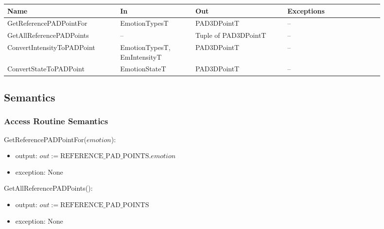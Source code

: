 \begin{center}
    \renewcommand{\arraystretch}{1.2}
    \begin{tabular}{m{0.27\linewidth} m{0.18\linewidth} m{0.22\linewidth}
    m{0.23\linewidth}}
        \toprule
        \textbf{Name} & \textbf{In} & \textbf{Out} & \textbf{Exceptions} \\
        \midrule

        \rowcolor[gray]{0.9}GetReferencePADPointFor & EmotionTypesT &
        PAD3DPointT & -- \\

        GetAllReferencePADPoints & -- & Tuple of PAD3DPointT & -- \\

        \rowcolor[gray]{0.9}ConvertIntensityToPADPoint & EmotionTypesT,
        EmIntensityT & PAD3DPointT & -- \\

        ConvertStateToPADPoint & EmotionStateT & PAD3DPointT & -- \\

        \bottomrule
    \end{tabular}
\end{center}

\subsection{Semantics}

\subsubsection{Access Routine Semantics}

\noindent GetReferencePADPointFor($\mathit{emotion}$):
\begin{itemize}

    \item output: $out := \text{REFERENCE\_PAD\_POINTS}.\mathit{emotion}$

    \item exception: None

\end{itemize}

\clearpage
\noindent GetAllReferencePADPoints():
\begin{itemize}

    \item output: $out := \text{REFERENCE\_PAD\_POINTS}$

    \item exception: None

\end{itemize}

